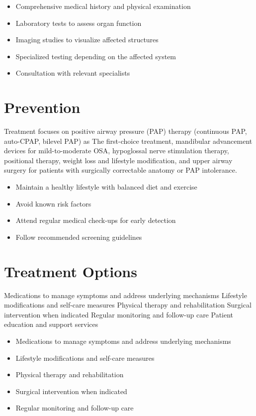 \begin{itemize}[noitemsep]
  \item Comprehensive medical history and physical examination
  \item Laboratory tests to assess organ function
  \item Imaging studies to visualize affected structures
  \item Specialized testing depending on the affected system
  \item Consultation with relevant specialists
\end{itemize}
\section{Prevention}
Treatment focuses on positive airway pressure (PAP) therapy (continuous PAP, auto-CPAP, bilevel PAP) as The first-choice treatment, mandibular advancement devices for mild-to-moderate OSA, hypoglossal nerve stimulation therapy, positional therapy, weight loss and lifestyle modification, and upper airway surgery for patients with surgically correctable anatomy or PAP intolerance.

\begin{itemize}[noitemsep]
  \item Maintain a healthy lifestyle with balanced diet and exercise
  \item Avoid known risk factors
  \item Attend regular medical check-ups for early detection
  \item Follow recommended screening guidelines
\end{itemize}
\section{Treatment Options}
Medications to manage symptoms and address underlying mechanisms Lifestyle modifications and self-care measures Physical therapy and rehabilitation Surgical intervention when indicated Regular monitoring and follow-up care Patient education and support services

\begin{itemize}[noitemsep]
  \item Medications to manage symptoms and address underlying mechanisms
  \item Lifestyle modifications and self-care measures
  \item Physical therapy and rehabilitation
  \item Surgical intervention when indicated
  \item Regular monitoring and follow-up care
\end{itemize}
